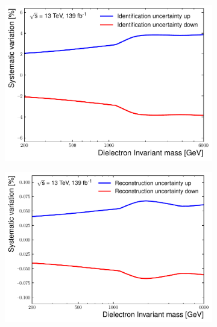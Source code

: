 \begin{figure}[]
\begin{subfigure}[b]{0.42\textwidth}
        \centering
        \includegraphics[width=\textwidth]{figures/analysis/datamc/Uncertainties/exp/ee/m_ee_pstOR_EL_EFF_ID_TOTAL_1NPCOR_PLUS_UNCOR__1up.pdf}
        \caption{}
        \label{fig:uncert:eeID}
    \end{subfigure}
    \begin{subfigure}[b]{0.42\textwidth}
        \centering
        \includegraphics[width=\textwidth]{figures/analysis/datamc/Uncertainties/exp/ee/m_ee_pstOR_EL_EFF_Reco_TOTAL_1NPCOR_PLUS_UNCOR__1up.pdf}
        \caption{}
        \label{fig:uncert:eeReco}
    \end{subfigure}
    \begin{subfigure}[b]{0.42\textwidth}
        \centering

\end{subfigure}
\end{figure}
